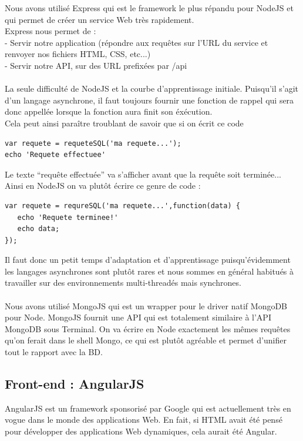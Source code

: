 \documentclass{report}
\begin{document}
Nous avons utilisé Express qui est le framework le plus répandu pour NodeJS et qui permet de créer un service Web très rapidement.\\

Express nous permet de :\\
- Servir notre application (répondre aux requêtes sur l'URL du service et renvoyer nos fichiers HTML, CSS, etc...)\\
- Servir notre API, sur des URL prefixées par /api\\\\

La seule difficulté de NodeJS et la courbe d'apprentissage initiale. Puisqu'il s'agit d'un langage asynchrone, il faut toujours fournir une fonction de rappel qui sera donc appellée lorsque la fonction aura finit son éxécution.\\

Cela peut ainsi paraître troublant de savoir que si on écrit ce code

\begin{lstlisting}	
var requete = requeteSQL('ma requete...');
echo 'Requete effectuee'
\end{lstlisting}

Le texte “requête effectuée” va s'afficher avant que la requête soit terminée...\\
Ainsi en NodeJS on va plutôt écrire ce genre de code :
\begin{lstlisting}
var requete = requreSQL('ma requete...',function(data) {
   echo 'Requete terminee!'
   echo data;
});
\end{lstlisting}

Il faut donc un petit temps d'adaptation et d'apprentissage puisqu'évidemment les langages asynchrones sont plutôt rares et nous sommes en général habitués à travailler sur des environnements multi-threadés mais synchrones.\\\\

Nous avons utilisé MongoJS qui est un wrapper pour le driver natif MongoDB pour Node. MongoJS fournit une API qui est totalement similaire à l'API MongoDB sous Terminal. On va écrire en Node exactement les mêmes requêtes qu'on ferait dans le shell Mongo, ce qui est plutôt agréable et permet d'unifier tout le rapport avec la BD.
\newpage

\subsection{Front-end : AngularJS}
AngularJS est un framework sponsorisé par Google qui est actuellement très en vogue dans le monde des applications Web. En fait, si HTML avait été pensé pour développer des applications Web dynamiques, cela aurait été Angular.
\end{document}

